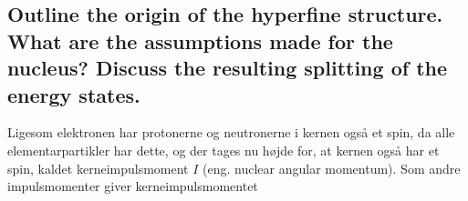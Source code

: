 \subsection{Outline the origin of the hyperfine structure. What are the assumptions made for the nucleus? Discuss the resulting splitting of the energy states.}


Ligesom elektronen har protonerne og neutronerne i kernen også et spin, da alle elementarpartikler har dette, og der tages nu højde for, at kernen også har et spin, kaldet kerneimpulsmoment $I$ (eng. nuclear angular momentum). Som andre impulsmomenter giver kerneimpulsmomentet